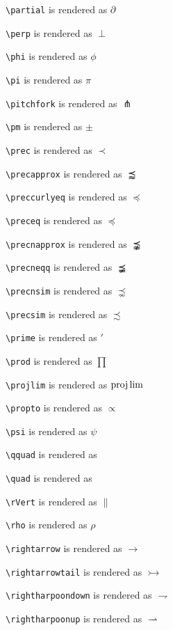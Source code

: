 \texttt{\textbackslash partial} is rendered as $\partial$

\texttt{\textbackslash perp} is rendered as $\perp$

\texttt{\textbackslash phi} is rendered as $\phi$

\texttt{\textbackslash pi} is rendered as $\pi$

\texttt{\textbackslash pitchfork} is rendered as $\pitchfork$

\texttt{\textbackslash pm} is rendered as $\pm$

\texttt{\textbackslash prec} is rendered as $\prec$

\texttt{\textbackslash precapprox} is rendered as $\precapprox$

\texttt{\textbackslash preccurlyeq} is rendered as $\preccurlyeq$

\texttt{\textbackslash preceq} is rendered as $\preceq$

\texttt{\textbackslash precnapprox} is rendered as $\precnapprox$

\texttt{\textbackslash precneqq} is rendered as $\precneqq$

\texttt{\textbackslash precnsim} is rendered as $\precnsim$

\texttt{\textbackslash precsim} is rendered as $\precsim$

\texttt{\textbackslash prime} is rendered as $\prime$

\texttt{\textbackslash prod} is rendered as $\prod$

\texttt{\textbackslash projlim} is rendered as $\projlim$

\texttt{\textbackslash propto} is rendered as $\propto$

\texttt{\textbackslash psi} is rendered as $\psi$

\texttt{\textbackslash qquad} is rendered as $\qquad$

\texttt{\textbackslash quad} is rendered as $\quad$

\texttt{\textbackslash rVert} is rendered as $\rVert$

\texttt{\textbackslash rho} is rendered as $\rho$

\texttt{\textbackslash rightarrow} is rendered as $\rightarrow$

\texttt{\textbackslash rightarrowtail} is rendered as $\rightarrowtail$

\texttt{\textbackslash rightharpoondown} is rendered as $\rightharpoondown$

\texttt{\textbackslash rightharpoonup} is rendered as $\rightharpoonup$

